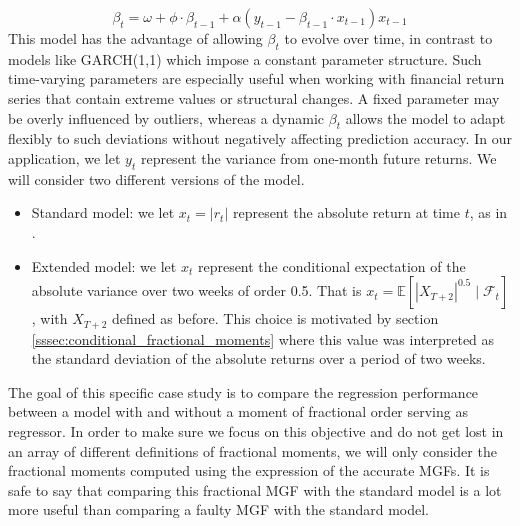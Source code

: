 \begin{equation}
    \beta_t = \omega + \phi \cdot \beta_{t-1} + \alpha(y_{t-1} - \beta_{t-1}\cdot x_{t-1})x_{t-1}
\end{equation}
 This model has the advantage of allowing \(\beta_t\) to evolve over time, in contrast to models like GARCH(1,1) which impose a constant parameter structure. Such time-varying parameters are especially useful when working with financial return series that contain extreme values or structural changes. A fixed parameter may be overly influenced by outliers, whereas a dynamic \(\beta_t\) allows the model to adapt flexibly to such deviations without negatively affecting prediction accuracy. In our application, we let \(y_t\) represent the variance from one-month future returns. We will consider two different versions of the model.
\begin{itemize}
    \item Standard model: we let \(x_t = |r_t|\) represent the absolute return at time \(t\), as in \cite{taylor2007}.
    \item Extended model: we let \(x_t\) represent the conditional expectation of the absolute variance over two weeks of order 0.5. That is \(x_t = \mathbb{E}[|X_{T + 2}|^{0.5} \mid \mathcal{F}_t]\), with \(X_{T + 2}\) defined as before. This choice is motivated by section \ref{sssec:conditional_fractional_moments} where this value was interpreted as the standard deviation of the absolute returns over a period of two weeks.  
\end{itemize}
The goal of this specific case study is to compare the regression performance between a model with and without a moment of fractional order serving as regressor. In order to make sure we focus on this objective and do not get lost in an array of different definitions of fractional moments, we will only consider the fractional moments computed using the expression of the accurate MGFs. It is safe to say that comparing this fractional MGF with the standard model is a lot more useful than comparing a faulty MGF with the standard model.


